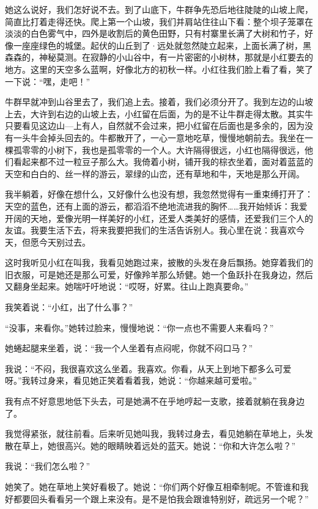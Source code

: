 她这么说好，我们怎好说不去。到了山底下，牛群争先恐后地往陡陡的山坡上爬，简直比打着走得还快。爬上第一个山坡，我们并肩站住往山下看：整个坝子笼罩在淡淡的白色雾气中，四外是收割后的黄色田野，只有村寨里长满了大树和竹子，好像一座座绿色的城堡。起伏的山丘到了·远处就忽然陡立起来，上面长满了树，黑森森的，神秘莫测。在寂静的小山谷中，有一片密密的小树林，那就是小红要去的地方。这里的天空多么蓝啊，好像北方的初秋一样。小红往我们脸上看了看，笑了一下说：“嘿，走吧！” 

牛群早就冲到山谷里去了，我们追上去。接着，我们必须分开了。我到左边的山坡上去，大许到右边的山坡上去，小红留在后面，为的是不让牛群走得太散。其实牛只要看见这边山—上有人，自然就不会过来，把小红留在后面也是多余的，因为没有一头牛会掉头回去的。牛都散开了，一心一意地吃草，慢慢地朝前去。我坐在一棵孤零零的小树下，我也是孤零零的一个人。大许隔得很远，小红也隔得很远，他们看起来都不过一粒豆子那么大。我倚着小树，铺开我的棕衣坐着，面对着蓝蓝的天空和白白的、丝一样的游云，翠绿的山峦，还有草地和牛，天地是那么开阔。 

我半躺着，好像在想什么，又好像什么也没有想，我忽然觉得有一重束缚打开了：天空的蓝色，还有上面的游云，都滔滔不绝地流进我的胸怀……我开始倾诉：我爱开阔的天地，爱像光明一样美好的小红，还爱人类美好的感情，还爱我们三个人的友谊。我要生活下去，将来我要把我们的生活告诉别人。我心里在说：我喜欢今天，但愿今天别过去。 

这时我听见小红在叫我，我看见她跑过来，披散的头发在身后飘扬。她穿着我们的旧衣服，可是她还是那么可爱，好像羚羊那么矫健。她一个鱼跃扑在我身边，然后又翻身坐起来。她喘吁吁地说：“哎呀，好累。往山上跑真要命。” 

我笑着说：“小红，出了什么事？” 

“没事，来看你。”她转过脸来，慢慢地说：“你一点也不需要人来看吗？” 

她蜷起腿来坐着，说：“我一个人坐着有点闷呢，你就不闷口马？” 

我说：“不闷，我很喜欢这么坐着。我喜欢。你看，从天上到地下都多么可爱呀。”我转过身来，看见她正笑着看着我，她说：“你越来越可爱啦。” 

我有点不好意思地低下头去，可是她满不在乎地哼起一支歌，接着就躺在我身边了。 

我觉得紧张，就往前看。后来听见她叫我，我转过身去，看见她躺在草地上，头发散在草上，她很高兴。她的眼睛映着远处的蓝天。她说：“你和大许怎么啦？” 

我说：“我们怎么啦？” 

她笑了。她在草地上笑好看极了。她说：“你们两个好像互相牵制呢。不管谁和我好都要回头看看另一个跟上来没有。是不是怕我会跟谁特别好，疏远另一个呢？” 

